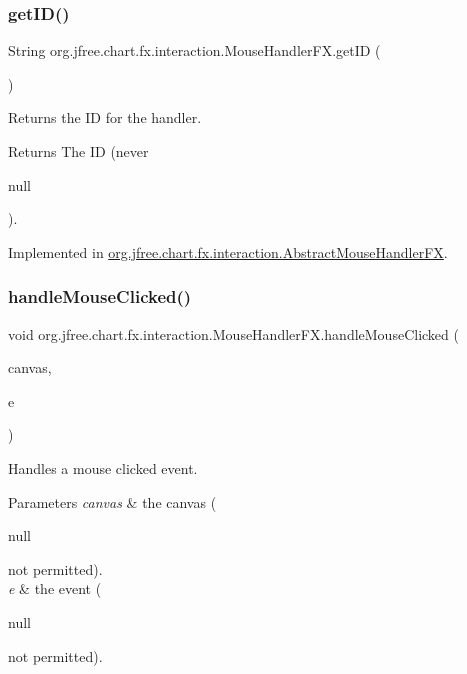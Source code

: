 \subsubsection{\texorpdfstring{get\+I\+D()}{getID()}}
{\footnotesize\ttfamily String org.\+jfree.\+chart.\+fx.\+interaction.\+Mouse\+Handler\+F\+X.\+get\+ID (\begin{DoxyParamCaption}{ }\end{DoxyParamCaption})}

Returns the ID for the handler.

\begin{DoxyReturn}{Returns}
The ID (never
\begin{DoxyCode}
null 
\end{DoxyCode}
 ). 
\end{DoxyReturn}


Implemented in \mbox{\hyperlink{classorg_1_1jfree_1_1chart_1_1fx_1_1interaction_1_1_abstract_mouse_handler_f_x_afb58abefdfef15a11ecdbb0fa72e4757}{org.\+jfree.\+chart.\+fx.\+interaction.\+Abstract\+Mouse\+Handler\+FX}}.

\mbox{\label{interfaceorg_1_1jfree_1_1chart_1_1fx_1_1interaction_1_1_mouse_handler_f_x_aa1761ee25681cfee7de718c887d4ae5e}} 
\subsubsection{\texorpdfstring{handle\+Mouse\+Clicked()}{handleMouseClicked()}}
{\footnotesize\ttfamily void org.\+jfree.\+chart.\+fx.\+interaction.\+Mouse\+Handler\+F\+X.\+handle\+Mouse\+Clicked (\begin{DoxyParamCaption}\item[{\mbox{\hyperlink{classorg_1_1jfree_1_1chart_1_1fx_1_1_chart_canvas}{Chart\+Canvas}}}]{canvas,  }\item[{Mouse\+Event}]{e }\end{DoxyParamCaption})}

Handles a mouse clicked event.


\begin{DoxyParams}{Parameters}
{\em canvas} & the canvas (
\begin{DoxyCode}
null 
\end{DoxyCode}
 not permitted). \\
\hline
{\em e} & the event (
\begin{DoxyCode}
null 
\end{DoxyCode}
 not permitted). \\
\hline
\end{DoxyParams}


